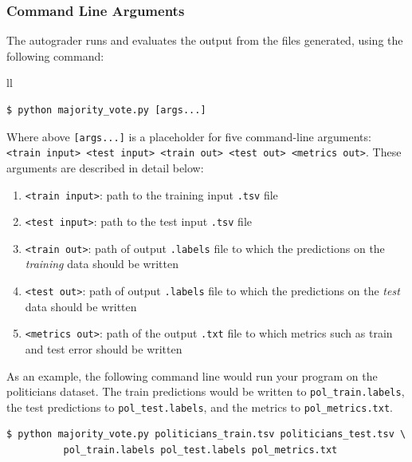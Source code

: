 \documentclass[11pt,addpoints,answers]{exam}
\begin{document}
\subsubsection{Command Line Arguments}

The autograder runs and evaluates the output from the files  generated, using the following command:

\begin{tabular}{ll}
\begin{lstlisting}[language=Shell]
$ python majority_vote.py [args...]

\end{lstlisting}
\end{tabular}

Where above \lstinline{[args...]} is a placeholder for five command-line arguments: 
\texttt{<train input> <test input> <train out> <test out> <metrics out>}. These arguments are described in detail below:
\begin{enumerate}
\item \lstinline{<train input>}: path to the training input \lstinline{.tsv} file 
\item \lstinline{<test input>}: path to the test input \lstinline{.tsv} file 
\item \lstinline{<train out>}: path of output \lstinline{.labels} file to which the predictions on the \textit{training} data should be written 
\item \lstinline{<test out>}: path of output \lstinline{.labels} file to which the predictions on the \emph{test} data should be written 
\item \lstinline{<metrics out>}: path of the output \lstinline{.txt} file to which metrics such as train and test error should be written 
\end{enumerate}

As an example, the following command line would run your program on the politicians dataset. The train predictions would be written to \lstinline{pol_train.labels}, the test predictions to \lstinline{pol_test.labels}, and the metrics to \lstinline{pol_metrics.txt}.
%
\begin{lstlisting}[language=Shell]
$ python majority_vote.py politicians_train.tsv politicians_test.tsv \ 
          pol_train.labels pol_test.labels pol_metrics.txt
\end{lstlisting}

\end{document}
